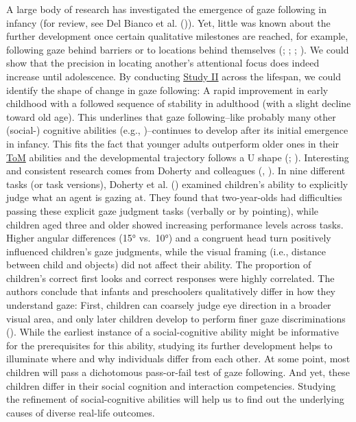\documentclass[
]{scrbook}
\begin{document}
A large body of research has investigated the emergence of gaze following in infancy (for review, see Del Bianco et al. ()). Yet, little was known about the further development once certain qualitative milestones are reached, for example, following gaze behind barriers or to locations behind themselves (; ; ; ). We could show that the precision in locating another's attentional focus does indeed increase until adolescence. By conducting \hyperref[studyII]{Study II} across the lifespan, we could identify the shape of change in gaze following: A rapid improvement in early childhood with a followed sequence of stability in adulthood (with a slight decline toward old age). This underlines that gaze following\thinspace --\thinspace like probably many other (social-) cognitive abilities (e.g., )\thinspace --\thinspace continues to develop after its initial emergence in infancy. This fits the fact that younger adults outperform older ones in their \hyperref[acronyms_ToM]{ToM} abilities and the developmental trajectory follows a U shape (; ). Interesting and consistent research comes from Doherty and colleagues (, ). In nine different tasks (or task versions), Doherty et al. () examined children's ability to explicitly judge what an agent is gazing at. They found that two-year-olds had difficulties passing these explicit gaze judgment tasks (verbally or by pointing), while children aged three and older showed increasing performance levels across tasks. Higher angular differences (15° vs.~10°) and a congruent head turn positively influenced children's gaze judgments, while the visual framing (i.e., distance between child and objects) did not affect their ability. The proportion of children's correct first looks and correct responses were highly correlated. The authors conclude that infants and preschoolers qualitatively differ in how they understand gaze: First, children can coarsely judge eye direction in a broader visual area, and only later children develop to perform finer gaze discriminations (). While the earliest instance of a social-cognitive ability might be informative for the prerequisites for this ability, studying its further development helps to illuminate where and why individuals differ from each other. At some point, most children will pass a dichotomous pass-or-fail test of gaze following. And yet, these children differ in their social cognition and interaction competencies. Studying the refinement of social-cognitive abilities will help us to find out the underlying causes of diverse real-life outcomes.
\end{document}
